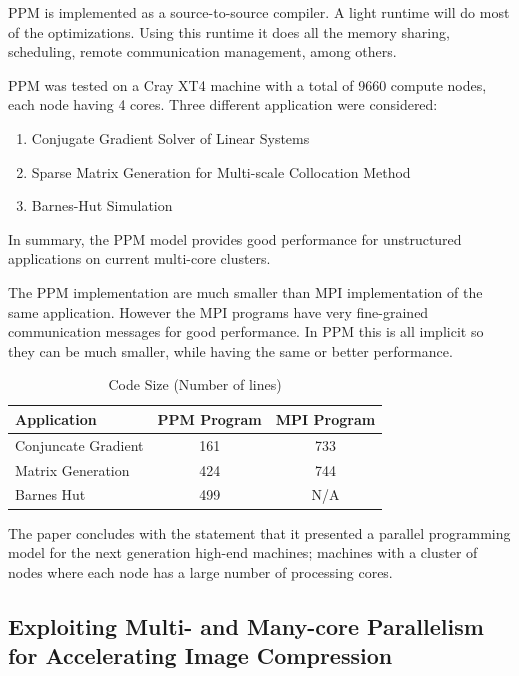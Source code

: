 PPM is implemented as a source-to-source compiler. A light runtime will do most
of the optimizations. Using this runtime it does all the memory sharing,
scheduling, remote communication management, among others.

PPM was tested on a Cray XT4 machine with a total of 9660 compute nodes, each
node having 4 cores. Three different application were considered:

\begin{enumerate}
	\item Conjugate Gradient Solver of Linear Systems
	\item Sparse Matrix Generation for Multi-scale Collocation Method
	\item Barnes-Hut Simulation
\end{enumerate}

In summary, the PPM model provides good performance for unstructured
applications on current multi-core clusters.

The PPM implementation are much smaller than MPI implementation of the same
application. However the MPI programs have very fine-grained communication
messages for good performance. In PPM this is all implicit so they can be
much smaller, while having the same or better performance.

\begin{table}
	\caption{Code Size (Number of lines)}
	\label{tab:code-size}
	\centering
	\begin{tabular}[!h]{|l|c|c|}
		\hline
		Application				& PPM Program	& MPI Program 	\\ \hline
		Conjuncate Gradient		& 161			& 733			\\ \hline
		Matrix Generation		& 424			& 744			\\ \hline
		Barnes Hut				& 499			& N/A			\\ \hline
	\end{tabular}
\end{table}

The paper concludes with the statement that it presented a parallel programming model for the
next generation high-end machines; machines with a cluster of nodes where each node has a large number of processing cores. 



\subsection{Exploiting Multi- and Many-core Parallelism for Accelerating Image Compression}

